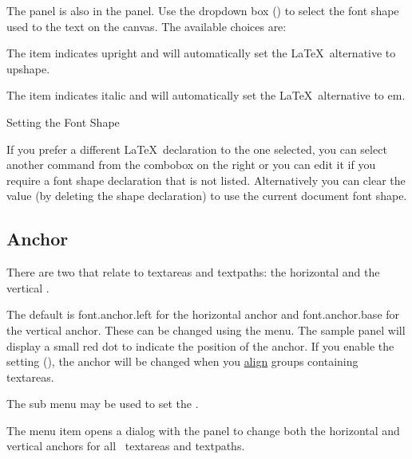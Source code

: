 
The  panel is also in the 
panel. Use the dropdown box () to
select the font shape used to  the
text on the \gls{canvas}.
The available choices are:


The  item indicates upright and
will automatically set the \LaTeX\ alternative to \gls{upshape}.


The  item indicates italic and
will automatically set the \LaTeX\ alternative to \gls{em}.

{}
{Setting the Font Shape}

If you prefer a different \LaTeX\ declaration to the one selected,
you can select another command from the \gls{combobox} on the right
or you can edit it if you require a font shape declaration that is
not listed.  Alternatively you can clear the value (by deleting the
shape declaration) to use the current document font shape.

\subsection{Anchor}\label{sec:fontanchor}

There are two 
that relate to \glspl{textarea} and \glspl{textpath}: the horizontal
 and the vertical .

The default is \gls{font.anchor.left} for the horizontal anchor and
\gls{font.anchor.base} for the vertical anchor. These can be changed
using the  menu. The sample panel will
display a small red dot to indicate the position of the anchor. If
you enable the  setting
(), the anchor will be changed when
you \hyperref[sec:alignobjects]{align} groups containing \glspl{textarea}.


The  sub menu may be used to set the
.


The  menu item opens a dialog
with the  panel to change both the horizontal
and vertical anchors for all \selected\ \glspl{textarea} and
\glspl{textpath}.


